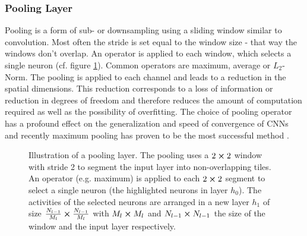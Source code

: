 \subsubsection{Pooling Layer}
Pooling is a form of sub- or downsampling using a sliding window similar to convolution. Most often the stride is set equal to the window size - that way the windows don't overlap. An operator is applied to each window, which selects a single neuron (cf. figure \ref{fig:pooling}). Common operators are maximum, average or $L_2$-Norm. The pooling is applied to each channel and leads to a reduction in the spatial dimensions. This reduction corresponds to a loss of information or reduction in degrees of freedom and therefore reduces the amount of computation required as well as the possibility of overfitting. The choice of pooling operator has a profound effect on the generalization and speed of convergence of CNNs and recently maximum pooling has proven to be the most successful method \cite{pooling1,pooling2}.
\begin{figure}[H]
    \centering
{}
\caption[Illustration of a pooling layer]{Illustration of a pooling layer. The pooling uses a $2\cp 2$ window with stride 2 to segment the input layer into non-overlapping tiles. An operator (e.g. maximum) is applied to each $2\cp 2$ segment to select a single neuron (the highlighted neurons in layer $h_0$). The activities of the selected neurons are arranged in a new layer $h_1$ of size $\frac{N_{l-1}}{M_l}\cp \frac{N_{l-1}}{M_l}$ with $M_{l}\cp M_{l}$ and $N_{l-1}\cp N_{l-1}$ the size of the window and the input layer respectively.}\label{fig:pooling}
\end{figure}\noindent
